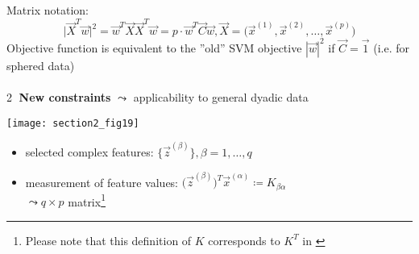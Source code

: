 Matrix notation:
\begin{equation}
	\big| \vec{X}^T \vec{w} \big|^2 = \vec{w}^T \vec{X} \vec{X}^T \vec{w}
	= p \cdot \vec{w}^T \vec{C} \vec{w}, 
	\vec{X} = \Big( \vec{x}^{(1)}, \vec{x}^{(2)}, \ldots, \vec{x}^{(p)}
		\Big)
\end{equation}
Objective function is equivalent to the ''old'' SVM objective $|\vec{w}|^2$ if $\vec{C} = \vec{1}$ (i.e. for sphered data)
\\\\
\textcircled{2} {\bf New constraints}
$\leadsto$ applicability to general dyadic data

\texttt{[image: section2\_fig19]}

\begin{itemize}
\item selected complex features:
  $\Big\{ \vec{z}^{(\beta)} \Big\}, \beta = 1, \ldots, q$

\item measurement of feature values: $\Big( \vec{z}^{(\beta)} \Big)^T \vec{x}^{(\alpha)} \coloneqq K_{\beta \alpha} $\\
  $\leadsto q \times p$ matrix\footnote{Please note that this
    definition of $K$ corresponds to $K^T$ in
    \textcite{HochreiterObermayer2006}}
\end{itemize}

